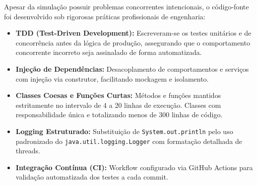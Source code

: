 \documentclass[12pt,a4paper]{article}
\begin{document}
\noindent Apesar da simulação possuir problemas concorrentes intencionais, o código-fonte foi desenvolvido sob rigorosas práticas profissionais de engenharia:
\begin{itemize}
    \item \textbf{TDD (Test-Driven Development):} Escreveram-se os testes unitários e de concorrência antes da lógica de produção, assegurando que o comportamento concorrente incorreto seja assinalado de forma automatizada.
    \item \textbf{Injeção de Dependências:} Desacoplamento de comportamentos e serviços com injeção via construtor, facilitando mockagem e isolamento.
    \item \textbf{Classes Coesas e Funções Curtas:} Métodos e funções mantidos estritamente no intervalo de 4 a 20 linhas de execução. Classes com responsabilidade única e totalizando menos de 300 linhas de código.
    \item \textbf{Logging Estruturado:} Substituição de \texttt{System.out.println} pelo uso padronizado do \texttt{java.util.logging.Logger} com formatação detalhada de threads.
    \item \textbf{Integração Contínua (CI):} Workflow configurado via GitHub Actions para validação automatizada dos testes a cada commit.
\end{itemize}
\end{document}
